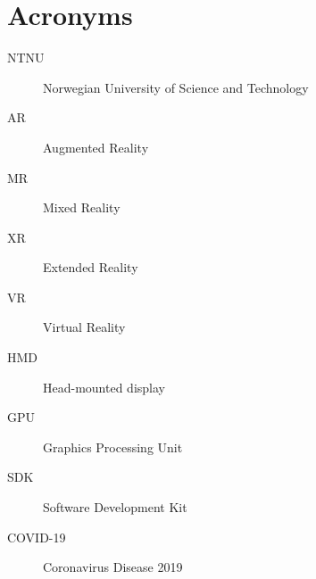 
\chapter{Acronyms}
\begin{description}
\item[NTNU] Norwegian University of Science and Technology
\item[AR] Augmented Reality
\item[MR] Mixed Reality
\item[XR] Extended Reality
\item[VR] Virtual Reality
\item[HMD] Head-mounted display
\item[GPU] Graphics Processing Unit
\item[SDK] Software Development Kit
\item[COVID-19] Coronavirus Disease 2019
\end{description}